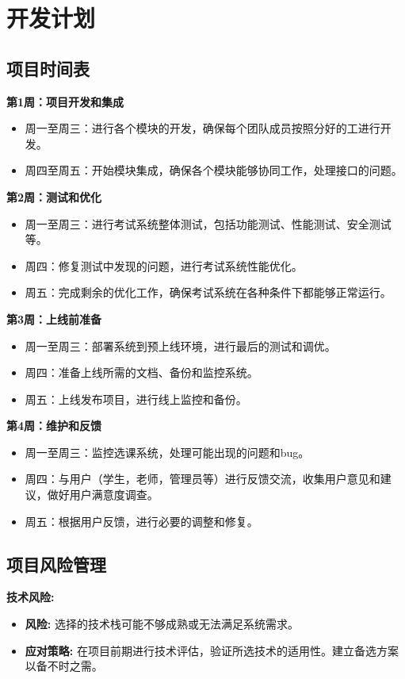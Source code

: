 \documentclass{article}
\begin{document}
\section{开发计划}
\subsection{项目时间表}
\textbf{第1周：项目开发和集成}
\begin{itemize}
  \item 周一至周三：进行各个模块的开发，确保每个团队成员按照分好的工进行开发。
  \item 周四至周五：开始模块集成，确保各个模块能够协同工作，处理接口的问题。
\end{itemize}

\textbf{第2周：测试和优化}
\begin{itemize}
  \item 周一至周三：进行考试系统整体测试，包括功能测试、性能测试、安全测试等。
  \item 周四：修复测试中发现的问题，进行考试系统性能优化。
  \item 周五：完成剩余的优化工作，确保考试系统在各种条件下都能够正常运行。
\end{itemize}

\textbf{第3周：上线前准备}
\begin{itemize}
  \item 周一至周三：部署系统到预上线环境，进行最后的测试和调优。
  \item 周四：准备上线所需的文档、备份和监控系统。
  \item 周五：上线发布项目，进行线上监控和备份。
\end{itemize}

\textbf{第4周：维护和反馈}
\begin{itemize}
  \item 周一至周三：监控选课系统，处理可能出现的问题和bug。
  \item 周四：与用户（学生，老师，管理员等）进行反馈交流，收集用户意见和建议，做好用户满意度调查。
  \item 周五：根据用户反馈，进行必要的调整和修复。
\end{itemize}
\subsection{项目风险管理}
\textbf{技术风险:}
\begin{itemize}
  \item \textbf{风险:} 选择的技术栈可能不够成熟或无法满足系统需求。
  \item \textbf{应对策略:} 在项目前期进行技术评估，验证所选技术的适用性。建立备选方案以备不时之需。
\end{itemize}
\end{document}
